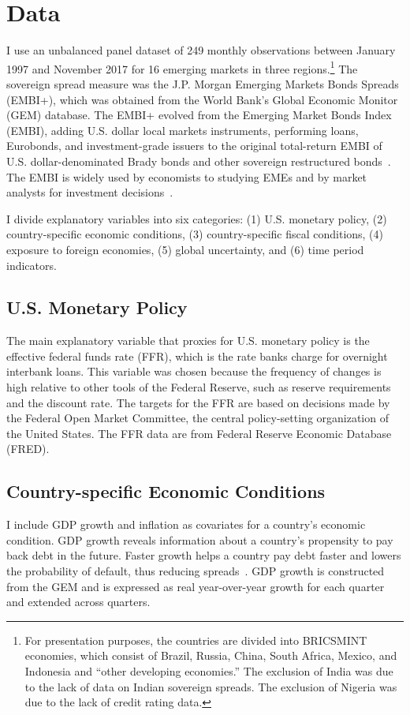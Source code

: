 \documentclass[12pt]{article}
\begin{document}
\section{Data}
\label{section:data}
I use an unbalanced panel dataset of 249 monthly observations between January 1997 and November 2017 for 16 emerging markets in three regions.\footnote{For presentation purposes, the countries are divided into BRICSMINT economies, which consist of Brazil, Russia, China, South Africa, Mexico, and Indonesia and ``other developing economies.'' The exclusion of India was due to the lack of data on Indian sovereign spreads. The exclusion of Nigeria was due to the lack of credit rating data.} The sovereign spread measure was the J.P. Morgan Emerging Markets Bonds Spreads (EMBI+), which was obtained from the World Bank's Global Economic Monitor (GEM) database. The EMBI+ evolved from the Emerging Market Bonds Index (EMBI), adding U.S. dollar local markets instruments, performing loans, Eurobonds, and investment-grade issuers to the original total-return EMBI of U.S. dollar-denominated Brady bonds and other sovereign restructured bonds~\parencite{gaillard12}. The EMBI is widely used by economists to studying EMEs and by market analysts for investment decisions~\parencite{ms19}.

I divide explanatory variables into six categories: (1) U.S. monetary policy, (2) country-specific economic conditions, (3) country-specific fiscal conditions, (4) exposure to foreign economies,  (5) global uncertainty, and (6) time period indicators.
\subsection{U.S. Monetary Policy}
The main explanatory variable that proxies for U.S. monetary policy is the effective federal funds rate (FFR), which is the rate banks charge for overnight interbank loans. This variable was chosen because the frequency of changes is high relative to other tools of the Federal Reserve, such as reserve requirements and the discount rate. The targets for the FFR are based on decisions made by the Federal Open Market Committee, the central policy-setting organization of the United States. The FFR data are from Federal Reserve Economic Database (FRED).
\subsection{Country-specific Economic Conditions}
I include GDP growth and inflation as covariates for a country's economic condition. GDP growth reveals information about a country's propensity to pay back debt in the future. Faster growth helps a country pay debt faster and lowers the probability of default, thus reducing spreads~\parencite{eichengreen00}. GDP growth is constructed from the GEM and is expressed as real year-over-year growth for each quarter and extended across quarters.
\end{document}
